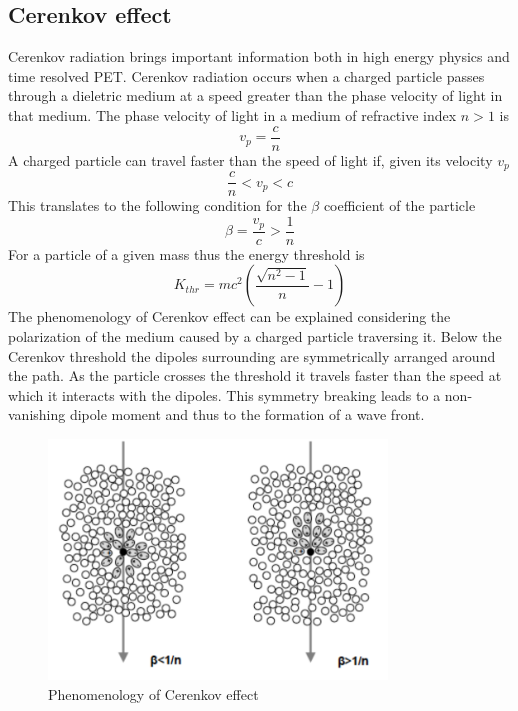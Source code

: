 \subsection{Cerenkov effect}
Cerenkov radiation brings important information both in high energy physics and time resolved PET.
Cerenkov radiation occurs when a charged particle passes through a dieletric medium at a speed greater than the phase velocity of light in that medium.
The phase velocity of light in a medium of refractive index $n > 1$ is
\begin{equation}
v_{p} = \frac{c}{n}
\end{equation}
A charged particle can travel faster than the speed of light if, given its velocity $v_{p}$ 
\begin{equation}
\frac{c}{n} < v_{p} < c
\end{equation}
This translates to the following condition for the $\beta$ coefficient of the particle
\begin{equation}
\beta = \frac{v_{p}}{c} > \frac{1}{n}
\end{equation}
For a particle of a given mass thus the energy threshold is
\begin{equation}
K_{thr} = mc^{2}\left( \frac{\sqrt {n^{2}-1}}{n} - 1 \right)
\label{eq:thr}
\end{equation}
The phenomenology of Cerenkov effect can be explained considering the polarization of the medium caused by a charged particle traversing it.
Below the Cerenkov threshold the dipoles surrounding are symmetrically arranged around the path. As the particle crosses the threshold it travels faster than the speed at which it interacts with the dipoles. This symmetry breaking leads to a non-vanishing dipole moment and thus to the formation of a wave front.

\begin{figure}
\centering
\includegraphics[width=9cm]{../Pictures/Chapter_2/cerenkov.pdf}
\caption[Cerenkov effect]{Phenomenology of Cerenkov effect}
\label{fig:cerenkov}
\end{figure}

